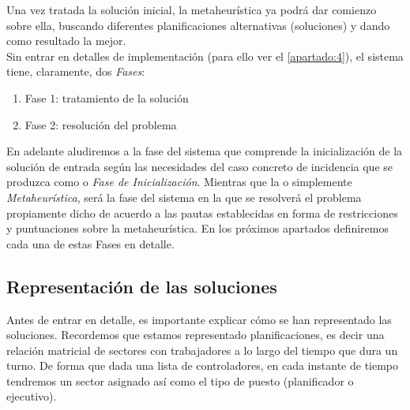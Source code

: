 Una vez tratada la solución inicial, la metaheurística ya podrá dar comienzo sobre ella, buscando diferentes 
planificaciones alternativas (soluciones) y dando como resultado la mejor. 
\\


Sin entrar en detalles de implementación (para ello ver el \autoref{apartado:4}), el sistema tiene, claramente, dos 
\textit{Fases}:
\begin{enumerate}[label={}]
	\item \label{Fase 1} Fase 1: tratamiento de la solución
	\item \label{Fase 2} Fase 2: resolución del problema
\end{enumerate}

En adelante aludiremos a la fase del sistema que comprende la inicialización de la solución de entrada según las necesidades del caso concreto de incidencia que se produzca como \faseuno{} o \textit{Fase de Inicialización}. 
Mientras que la \fasedos{} o simplemente \textit{Metaheurística}, será la fase del sistema en la que se resolverá el problema propiamente dicho de acuerdo a las pautas establecidas en forma de restricciones y puntuaciones sobre la metaheurística.
En los próximos apartados definiremos cada una de estas Fases en detalle.

\subsection{Representación de las soluciones}
Antes de entrar en detalle, es importante explicar cómo se han representado las soluciones. Recordemos que estamos representado planificaciones, es decir una relación matricial de sectores con trabajadores a lo largo del tiempo que dura un turno. De forma que dada una lista de controladores, en cada instante de tiempo tendremos un sector asignado así como el tipo de puesto (planificador o ejecutivo).
\\

